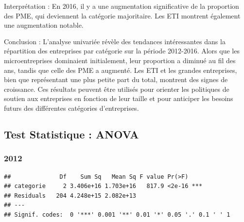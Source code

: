 \documentclass[mstat,12pt]{unswthesis}
\begin{document}
Interprétation : En 2016, il y a une augmentation significative de la
proportion des PME, qui deviennent la catégorie majoritaire. Les ETI
montrent également une augmentation notable.

\medskip

Conclusion : L'analyse univariée révèle des tendances intéressantes dans
la répartition des entreprises par catégorie sur la période 2012-2016.
Alors que les microentreprises dominaient initialement, leur proportion
a diminué au fil des ans, tandis que celle des PME a augmenté. Les ETI
et les grandes entreprises, bien que représentant une plus petite part
du total, montrent des signes de croissance. Ces résultats peuvent être
utilisés pour orienter les politiques de soutien aux entreprises en
fonction de leur taille et pour anticiper les besoins futurs des
différentes catégories d'entreprises.

\newpage

\subsection{Test Statistique : ANOVA}\label{test-statistique-anova}

\medskip

\subsubsection{\texorpdfstring{\textbf{2012}}{2012}}\label{section}

\medskip

\begin{verbatim}
##              Df    Sum Sq   Mean Sq F value Pr(>F)    
## categorie     2 3.406e+16 1.703e+16   817.9 <2e-16 ***
## Residuals   204 4.248e+15 2.082e+13                   
## ---
## Signif. codes:  0 '***' 0.001 '**' 0.01 '*' 0.05 '.' 0.1 ' ' 1
\end{verbatim}
\end{document}
